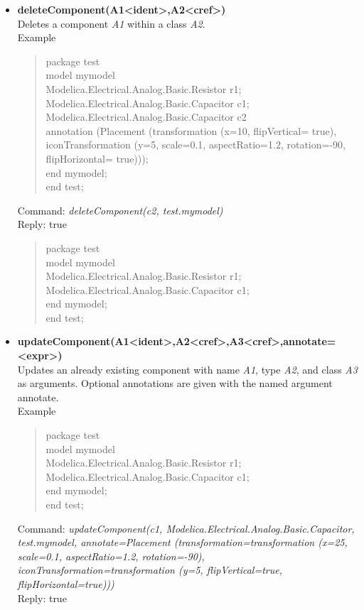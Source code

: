 \documentclass[11pt,a4paper,oneside,english]{book}
\newenvironment{modelicaExamples}{\begin{itemize}}{\end{itemize}}
\newcommand{\api}[2]{\item \textbf{#1} \\ #2}
\newcommand{\tab}{\hspace{2em}}
\newcommand{\command}[1]{Command: \textit{#1}\\}
\newcommand{\reply}[1]{Reply: #1}
\newcommand{\functionex}[2]{\begin{singlespace} \command{#1} \reply{#2} \end{singlespace}}
\newcommand{\examples}{Example}
\newenvironment{mocode}{\begin{verse}\begin{singlespace}\begin{scriptsize}\ttfamily}{\end{scriptsize}\end{singlespace}\end{verse}}
\begin{document}
\begin{modelicaExamples}
		\api{deleteComponent(A1<ident>,A2<cref>)}{Deletes a component \textit{A1} within a class \textit{A2}.\\
		\examples
		\begin{mocode}
		package test\\
		\tab model mymodel\\
		\tab\tab Modelica.Electrical.Analog.Basic.Resistor r1;\\
		\tab\tab Modelica.Electrical.Analog.Basic.Capacitor c1;\\
		\tab\tab Modelica.Electrical.Analog.Basic.Capacitor c2\\
annotation (Placement (trans\-for\-ma\-tion (x=10, flip\-Ver\-ti\-cal= true), i\-con\-Trans\-for\-ma\-tion (y=5, sca\-le=0.1, a\-spect\-Ra\-tio=1.2, ro\-ta\-ti\-on=-90, flip\-Ho\-ri\-zon\-tal= true)));\\
		\tab end mymodel;\\
		end test;
		\end{mocode}
		\functionex{deleteComponent(c2, test.mymodel)}
		{true}
		
		\begin{mocode}
		package test\\
		\tab model mymodel\\
		\tab\tab Modelica.Electrical.Analog.Basic.Resistor r1;\\
		\tab\tab Modelica.Electrical.Analog.Basic.Capacitor c1;\\
		\tab end mymodel;\\
		end test;\\
		\end{mocode}
		}
		
		\api{updateComponent(A1<ident>,A2<cref>,A3<cref>,annotate=<expr>)}{Updates an already existing component with name \textit{A1}, type \textit{A2}, and class \textit{A3} as arguments. Optional annotations are given with the named argument annotate.\\
		\examples
		\begin{mocode}
		package test\\
		\tab model mymodel\\
		\tab\tab Modelica.Electrical.Analog.Basic.Resistor r1;\\
		\tab\tab Modelica.Electrical.Analog.Basic.Capacitor c1;\\
		\tab end mymodel;\\
		end test;\\
		\end{mocode}
		\functionex{updateComponent(c1, Modelica.Electrical.Analog.Basic.Capacitor, test.mymodel, annotate=Placement (transformation=transformation (x=25, scale=0.1, aspectRatio=1.2, rotation=-90),  iconTransformation=transformation (y=5, flipVertical=true, flipHorizontal=true)))}
		{true}
		
}
\end{modelicaExamples}
\end{document}
